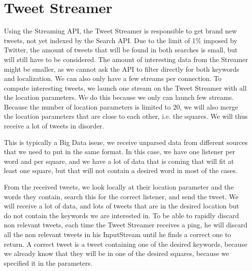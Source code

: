 \section{Tweet Streamer}
Using the Streaming API, the Tweet Streamer is responsible to get brand new tweets, not yet indexed by the Search API. Due to the limit of 1\% imposed by Twitter, the amount of tweets that will be found in both searches is small, but will still have to be considered. The amount of interesting data from the Streamer might be smaller, as we cannot ask the API to filter directly for both keywords and localization. We can also only have a few streams per connection. To compute interesting tweets, we launch one stream on the Tweet Streamer with all the location parameters. We do this because we only can launch few streams. Because the number of location parameters is limited to 20, we will also merge the location parameters that are close to each other, i.e. the squares. We will thus receive a lot of tweets in disorder.

This is typically a Big Data issue, we receive unparsed data from different sources that we need to put in the same format. In this case, we have one listener per word and per square, and we have a lot of data that is coming that will fit at least one square, but that will not contain a desired word in most of the cases.

From the received tweets, we look locally at their location parameter and the words they contain, search this for the correct listener, and send the tweet. We will receive a lot of data, and lots of tweets that are in the desired location but do not contain the keywords we are interested in. To be able to rapidly discard non relevant tweets, each time the Tweet Streamer receives a ping, he will discard all the non relevant tweets in his InputStream until he finds a correct one to return. A correct tweet is a tweet containing one of the desired keywords, because we already know that they will be in one of the desired squares, because we specified it in the parameters.
